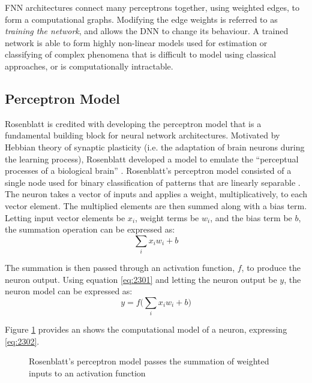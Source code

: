 FNN architectures connect many perceptrons together, using weighted edges, to form a computational graphs. Modifying the edge weights is referred to as \textit{training the network}, and allows the DNN to change its behaviour. A trained network is able to form highly non-linear models used for estimation or classifying of complex phenomena that is difficult to model using classical approaches, or is computationally intractable.



\subsection{Perceptron Model}
Rosenblatt is credited with developing the perceptron model that is a fundamental building block for neural network architectures. Motivated by Hebbian theory of synaptic plasticity (i.e. the adaptation of brain neurons during the learning process), Rosenblatt developed a model to emulate the ``perceptual processes of a biological brain'' \cite{Rosenblatt1957}. Rosenblatt's perceptron model consisted of a single node used for binary classification of patterns that are linearly separable \cite{Rosenblatt1958}. The neuron takes a vector of inputs and applies a weight, multiplicatively, to each vector element. The multiplied elements are then summed along with a bias term. Letting input vector elements be $x_i$, weight terms be $w_i$, and the bias term be $b$, the summation operation can be expressed as:
\begin{equation}
	\sum_{i}x_i w_i + b \label{eq:2301}
\end{equation} 

The summation is then passed through an activation function, $f$, to produce the neuron output. Using equation \ref{eq:2301} and letting the neuron output be $y$, the neuron model can be expressed as:
\begin{equation}
	y = f\bigg( \sum_{i}x_i w_i + b \bigg) \label{eq:2302}
\end{equation}

Figure \ref{fig:2301_perceptron_model} provides an shows the computational model of a neuron, expressing \ref{eq:2302}.

\begin{figure}[h]
	\centering
	
	\caption[Computational model of a perceptron]{Rosenblatt's perceptron model passes the summation of weighted inputs to an activation function}
	\label{fig:2301_perceptron_model}
\end{figure}


